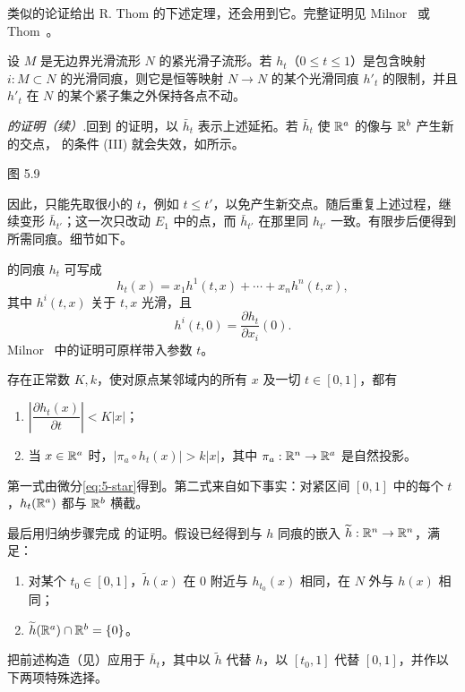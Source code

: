 \label{construction:page63}类似的论证给出 R. Thom 的下述定理，还会用到它。完整证明见 Milnor~\cite[p.~5]{ref12} 或 Thom~\cite{ref13}。

设 $M$ 是无边界光滑流形 $N$ 的紧光滑子流形。若 $h_t$（$0\leq t\leq1$）是包含映射 $i:M\subset N$ 的光滑同痕，则它是恒等映射 $N\to N$ 的某个光滑同痕 $h'_t$ 的限制，并且 $h'_t$ 在 $N$ 的某个紧子集之外保持各点不动。

\par\medskip\noindent\textit{ 的证明（续）.}\quad 回到 的证明，以 $\bar h_t$ 表示上述延拓。若 $\bar h_t$ 使 $\mathbb{R}^a$ 的像与 $\mathbb{R}^b$ 产生新的交点， 的条件 (III) 就会失效，如所示。

\begin{center}
  \FigFiveNine

  \label{fig:5.9}图 5.9
\end{center}

因此，只能先取很小的 $t$，例如 $t\leq t'$，以免产生新交点。随后重复上述过程，继续变形 $\bar h_{t'}$；这一次只改动 $E_1$ 中的点，而 $\bar h_{t'}$ 在那里同 $h_{t'}$ 一致。有限步后便得到所需同痕。细节如下。

 的同痕 $h_t$ 可写成
\[
  h_t(x)=x_1h^1(t,x)+\cdots+x_nh^n(t,x), \tag{$\star$}\label{eq:5-star}
\]
其中 $h^i(t,x)$ 关于 $t,x$ 光滑，且
\[
  h^i(t,0)=\frac{\partial h_t}{\partial x_i}(0).
\]
Milnor~\cite[p.~6]{ref04} 中的证明可原样带入参数 $t$。

存在正常数 $K,k$，使对原点某邻域内的所有 $x$ 及一切 $t\in[0,1]$，都有
\begin{enumerate}[label=\arabic*)]
  \item $\left|\dfrac{\partial h_t(x)}{\partial t}\right|<K|x|$；
  \item 当 $x\in\mathbb{R}^a$ 时，$|\pi_a\circ h_t(x)|>k|x|$，其中
  $\pi_a:\mathbb{R}^n\to\mathbb{R}^a$ 是自然投影。
\end{enumerate}

\Proof 第一式由微分\eqref{eq:5-star}得到。第二式来自如下事实：对紧区间 $[0,1]$ 中的每个 $t$，$h_t(\mathbb{R}^a)$ 都与 $\mathbb{R}^b$ 横截。
\EndProof

最后用归纳步骤完成 的证明。假设已经得到与 $h$ 同痕的嵌入 $\widetilde h:\mathbb{R}^n\to\mathbb{R}^n$，满足：
\begin{enumerate}[label=\arabic*)]
  \item 对某个 $t_0\in[0,1]$，$\widetilde h(x)$ 在 $0$ 附近与 $h_{t_0}(x)$ 相同，在 $N$ 外与 $h(x)$ 相同；
  \item $\widetilde h(\mathbb{R}^a)\cap\mathbb{R}^b=\{0\}$。
\end{enumerate}
把前述构造（见）应用于 $\bar h_t$，其中以 $\widetilde h$ 代替 $h$，以 $[t_0,1]$ 代替 $[0,1]$，并作以下两项特殊选择。

